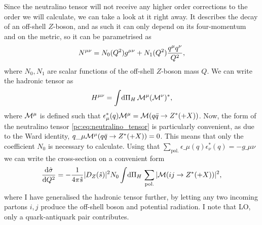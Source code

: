 \documentclass[../main.tex]{subfiles}
\begin{document}
Since the neutralino tensor will not receive any higher order corrections to the order we will calculate, we can take a look at it right away.
It describes the decay of an off-shell \(Z\)-boson, and as such it can only depend on its four-momentum and on the metric, so it can be parametrised as
\begin{equation}
  \label{pc:eq:neutralino_tensor}
  N\^{\mu\nu} = N_0(Q^2) \g + N_1(Q^2) \frac{q\^\mu q\^\nu}{Q^2},
\end{equation}
where \(N_0, N_1\) are scalar functions of the off-shell \(Z\)-boson mass \(Q\).
We can write the hadronic tensor as
\begin{equation}
  H\^{\mu\nu} = \integral{\Pi_H} \M\^\mu (\M\^\nu)^\ast,
\end{equation}
where \(\M\^\mu\) is defined such that \(\epsilon^\ast_\mu(q) \M\^\mu = \M(q\bar{q} \to Z^\ast (+ X))\).
Now, the form of the neutralino tensor \cref{pc:eq:neutralino_tensor} is particularly convenient, as due to the Ward identity, \(q\_\mu \M\^\mu(q\bar{q} \to Z^\ast (+ X)) = 0\).
This means that only the coefficient \(N_0\) is necessary to calculate.
Using that \(\sum_\text{pol.} \epsilon\_\mu(q) \epsilon_\nu^\ast(q) = -g\_{\mu\nu}\) we can write the cross-section on a convenient form
\begin{equation}
  \label{pc:eq:dsigma_dQ2_1}
  \d[Q^2]{\hat\sigma} = -\frac{1}{4\pi \hat{s}} |D_Z(\hat{s})|^2 N_0 \integral{\Pi_H} \sum_\text{pol.}|\M(ij \to Z^\ast (+ X))|^2,
\end{equation}
where I have generalised the hadronic tensor further, by letting any two incoming partons \(i,j\) produce the off-shell boson and potential radiation.
I note that LO, only a quark-antiquark pair contributes.
\end{document}
